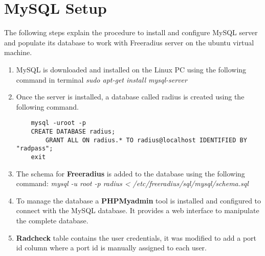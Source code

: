 \section{MySQL Setup}
The following steps explain the procedure to install and configure MySQL server and populate its database to work with Freeradius server on the ubuntu virtual machine.
\begin{enumerate}
	\item MySQL is downloaded and installed on the Linux PC using the following command in terminal \textit{sudo apt-get install mysql-server}
	\item Once the server is installed, a database called radius is created using the following command. 
	\begin{lstlisting}
	mysql -uroot -p
	CREATE DATABASE radius;
		GRANT ALL ON radius.* TO radius@localhost IDENTIFIED BY "radpass";
	exit
	\end{lstlisting}
	
	\item The schema for \textbf{Freeradius} is added to the database using the following command: \textit{mysql -u root -p radius < /etc/freeradius/sql/mysql/schema.sql}
	\item	To manage the database a\textbf{ PHPMyadmin} tool is installed and configured to connect with the MySQL database. It provides a web interface to manipulate the complete database.
	\item	\textbf{Radcheck} table contains the user credentials, it was modified to add a port id column where a port id is manually assigned to each user.
	
\end{enumerate}
